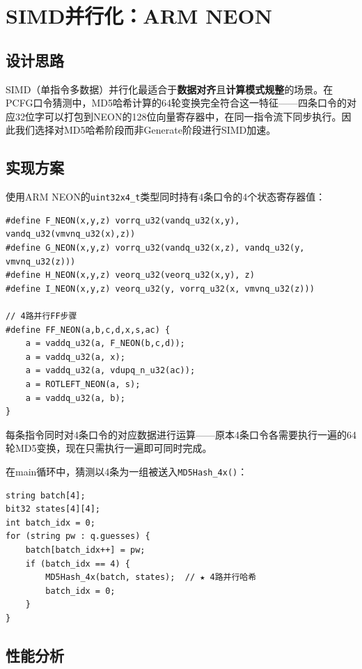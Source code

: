 \documentclass[12pt,a4paper]{ctexart}
\begin{document}
\section{SIMD并行化：ARM NEON}

\subsection{设计思路}

SIMD（单指令多数据）并行化最适合于\textbf{数据对齐}且\textbf{计算模式规整}的场景。在PCFG口令猜测中，MD5哈希计算的64轮变换完全符合这一特征——四条口令的对应32位字可以打包到NEON的128位向量寄存器中，在同一指令流下同步执行。因此我们选择对MD5哈希阶段而非Generate阶段进行SIMD加速。

\subsection{实现方案}

使用ARM NEON的\texttt{uint32x4\_t}类型同时持有4条口令的4个状态寄存器值：

\begin{lstlisting}[caption={NEON向量化MD5基本函数},label=lst:neon_func]
#define F_NEON(x,y,z) vorrq_u32(vandq_u32(x,y), vandq_u32(vmvnq_u32(x),z))
#define G_NEON(x,y,z) vorrq_u32(vandq_u32(x,z), vandq_u32(y, vmvnq_u32(z)))
#define H_NEON(x,y,z) veorq_u32(veorq_u32(x,y), z)
#define I_NEON(x,y,z) veorq_u32(y, vorrq_u32(x, vmvnq_u32(z)))

// 4路并行FF步骤
#define FF_NEON(a,b,c,d,x,s,ac) {
    a = vaddq_u32(a, F_NEON(b,c,d));
    a = vaddq_u32(a, x);
    a = vaddq_u32(a, vdupq_n_u32(ac));
    a = ROTLEFT_NEON(a, s);
    a = vaddq_u32(a, b);
}
\end{lstlisting}

每条指令同时对4条口令的对应数据进行运算——原本4条口令各需要执行一遍的64轮MD5变换，现在只需执行一遍即可同时完成。

在main循环中，猜测以4条为一组被送入\texttt{MD5Hash\_4x()}：

\begin{lstlisting}[caption={NEON批量MD5调用},label=lst:neon_batch]
string batch[4];
bit32 states[4][4];
int batch_idx = 0;
for (string pw : q.guesses) {
    batch[batch_idx++] = pw;
    if (batch_idx == 4) {
        MD5Hash_4x(batch, states);  // ★ 4路并行哈希
        batch_idx = 0;
    }
}
\end{lstlisting}

\subsection{性能分析}
\end{document}
